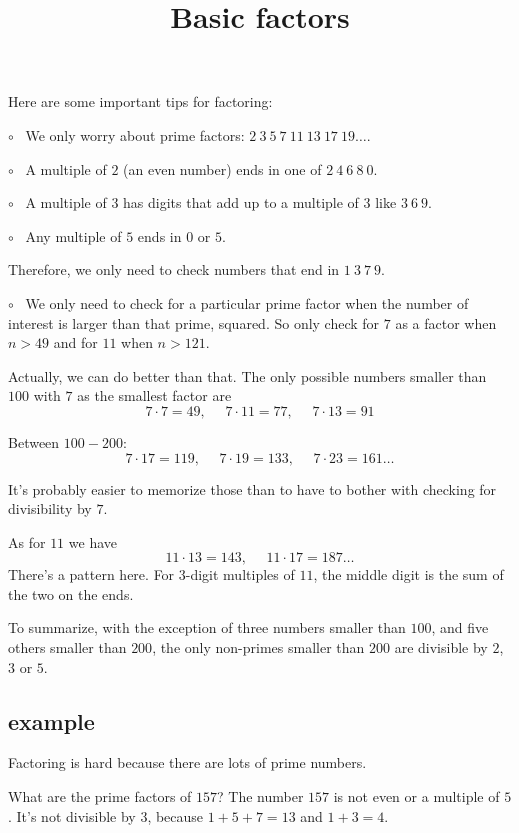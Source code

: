 \documentclass[11pt, oneside]{article}
\title{Basic factors}
\date{}
\begin{document}
\maketitle
\Large

Here are some important tips for factoring: 

$\circ$ \ We only worry about prime factors:  $2 \ 3 \ 5 \ 7 \ 11 \ 13 \ 17 \ 19 \dots$.

$\circ$ \ A multiple of $2$ (an even number) ends in one of $2 \ 4 \ 6 \ 8 \ 0$.  

$\circ$ \ A multiple of $3$ has digits that add up to a multiple of $3$ like $3 \ 6 \ 9$.

$\circ$ \ Any multiple of $5$ ends in $0$ or $5$.  

Therefore, we only need to check numbers that end in $1 \ 3 \ 7 \ 9$.

$\circ$ \ We only need to check for a particular prime factor when the number of interest is larger than that prime, squared.  So only check for $7$ as a factor when $n > 49$ and for $11$ when $n > 121$.

Actually, we can do better than that.  The only possible numbers smaller than $100$ with $7$ as the smallest factor are 
\[ 7 \cdot 7 = 49, \ \ \ \ \ \  7 \cdot 11 = 77, \ \ \ \ \ \ 7 \cdot 13 = 91 \]

Between $100-200$:
\[ 7 \cdot 17 = 119,  \ \ \ \ \ \  7 \cdot 19 = 133, \ \ \ \ \ \  7 \cdot 23 = 161 \dots \]

It's probably easier to memorize those than to have to bother with checking for divisibility by $7$.

As for $11$ we have
\[ 11 \cdot 13 = 143, \ \ \ \ \ \ 11 \cdot 17 = 187 \dots \]
There's a pattern here.  For $3$-digit multiples of $11$, the middle digit is the sum of the two on the ends.

To summarize, with the exception of three numbers smaller than $100$, and five others smaller than $200$, the only non-primes smaller than $200$ are divisible by $2$, $3$ or $5$.

\subsection*{example}

Factoring is hard because there are lots of prime numbers.  

What are the prime factors of $157$?  The number $157$ is not even or a multiple of $5$.  It's not divisible by $3$, because $1 + 5 + 7 = 13$ and $1 + 3 = 4$.  
\end{document}
